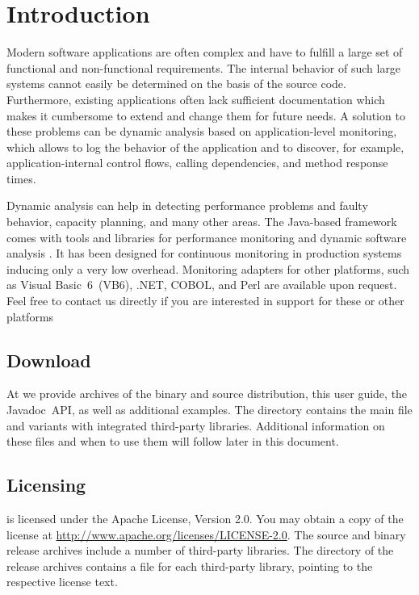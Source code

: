 \chapter{Introduction}\label{chp:Introduction}

	Modern software applications are often complex and have to fulfill a large set of functional and non-functional requirements. The internal behavior of such large systems cannot easily be determined on the basis of the source code. Furthermore, existing applications often lack sufficient documentation which makes it cumbersome to extend and change them for future needs. A solution to these problems can be dynamic analysis based on application-level monitoring, which allows to log the behavior of the application and to discover, for example, application-internal control flows, calling dependencies, and method response times.

	Dynamic analysis can help in detecting performance problems and faulty behavior, capacity planning, and many other areas. The Java-based \Kieker{} framework comes with tools and libraries for performance monitoring and dynamic software analysis \cite{KiekerICPE2012}. It has been designed for continuous monitoring in production systems inducing only a very low overhead. Monitoring adapters for other platforms, such as Visual Basic~6~(VB6), .NET, COBOL, and Perl are available upon request. Feel free to contact us directly if you are interested in \Kieker{} support for these or other platforms  \\

	
	\section{Download}
		
		At \KiekerDownloadURL{} we provide archives of the binary and source distribution, this user guide, the Javadoc~API, as well as additional examples. The   directory contains the main  file \file{\mainJar{}} and variants with integrated third-party libraries. Additional information on these files and when to use them will follow later in this document.
		
	\section{Licensing}
		\Kieker{} is licensed under the Apache License, Version 2.0. You may obtain a copy of the license at \url{http://www.apache.org/licenses/LICENSE-2.0}. The \Kieker{} source and binary release archives include a number of third-party libraries. The  directory of the release archives contains a  file for each third-party library, pointing to the respective license text.	
		
